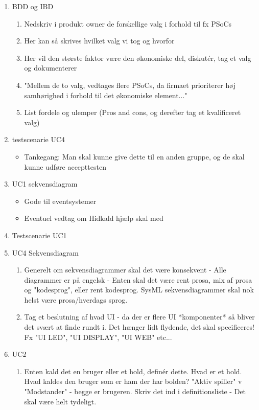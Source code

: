 \begin{enumerate}
    \item BDD og IBD
    \begin{enumerate}
        \item Nedskriv i produkt owner de forskellige valg i forhold til fx PSoCs 
        \item Her kan så skrives hvilket valg vi tog og hvorfor
        \item Her vil den største faktor være den økonomiske del, diskutér, tag et valg og dokumenterer 
        \item "Mellem de to valg, vedtages flere PSoCs, da firmaet prioriterer høj samhørighed i forhold til det økonomiske element..."
        \item List fordele og ulemper (Pros and cons, og derefter tag et kvalificeret valg) 
    \end{enumerate}
    \item  testscenarie UC4 
    \begin{itemize}
        \item Tankegang: Man skal kunne give dette til en anden gruppe, og de skal kunne udføre accepttesten 
    \end{itemize}
    \item  UC1 sekvensdiagram
    \begin{itemize}
        \item Gode til eventsystemer
        \item Eventuel vedtag om Hidkald hjælp skal med
    \end{itemize}
    \item  Testscenarie UC1 
    \item UC4 Sekvensdiagram
    \begin{enumerate}
        \item Generelt om sekvensdiagrammer skal det være konsekvent - Alle diagrammer er på engelsk - Enten skal det være rent prosa, mix af prosa og "kodesprog", eller rent kodesprog. SysML sekvensdiagrammer skal nok helst være prosa/hverdags sprog.
        \item Tag et beslutning af hvad UI - da der er flere UI *komponenter* så bliver det svært at finde rundt i. Det hænger lidt flydende, det skal specificeres! Fx "UI LED", "UI DISPLAY", "UI WEB" etc... 
    \end{enumerate}
    \item UC2
    \begin{enumerate}
        \item Enten kald det en bruger eller et hold, definér dette. Hvad er et hold. Hvad kaldes den bruger som er ham der har bolden? "Aktiv spiller" v "Modstander" - begge er brugeren. Skriv det ind i definitionsliste - Det skal være helt tydeligt. 

\end{enumerate}
\end{enumerate}
